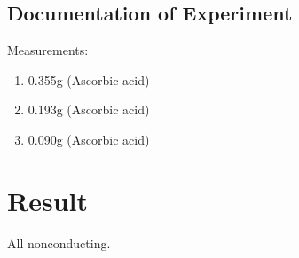 \documentclass{article}
\begin{document}
\subsection{Documentation of Experiment}
Measurements:
\begin{enumerate}
    \item 0.355g (Ascorbic acid) 
    \item 0.193g (Ascorbic acid) 
    \item 0.090g (Ascorbic acid) 


    
\end{enumerate}

\section{Result}
All nonconducting.
\end{document}
